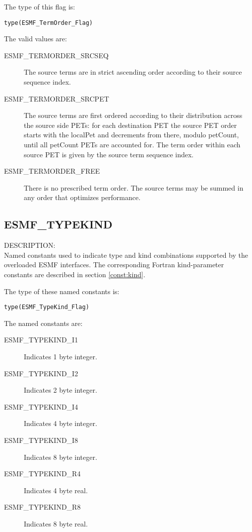 The type of this flag is:

{\tt type(ESMF\_TermOrder\_Flag)}

The valid values are:
\begin{description}

\item [ESMF\_TERMORDER\_SRCSEQ]
         The source terms are in strict ascending order according to
         their source sequence index.
\item [ESMF\_TERMORDER\_SRCPET]
         The source terms are first ordered according to their distribution
         across the source side PETs: for each destination PET the source PET
         order starts with the localPet and decrements from there, modulo
         petCount, until all petCount PETs are accounted for. The term order
         within each source PET is given by the source term sequence index.
\item [ESMF\_TERMORDER\_FREE]
         There is no prescribed term order. The source terms may be summed in 
         any order that optimizes performance.
\end{description}


\subsection{ESMF\_TYPEKIND}
\label{const:typekind}

{\sf DESCRIPTION:\\}
Named constants used to indicate type and kind combinations supported by the
overloaded ESMF interfaces. The corresponding Fortran kind-parameter constants
are described in section \ref{const:kind}.

The type of these named constants is:

{\tt type(ESMF\_TypeKind\_Flag)}

The named constants are:
\begin{description}
\item [ESMF\_TYPEKIND\_I1]
      Indicates 1 byte integer.
\item [ESMF\_TYPEKIND\_I2]
      Indicates 2 byte integer.
\item [ESMF\_TYPEKIND\_I4]
      Indicates 4 byte integer.
\item [ESMF\_TYPEKIND\_I8]
      Indicates 8 byte integer.
\item [ESMF\_TYPEKIND\_R4]
      Indicates 4 byte real.
\item [ESMF\_TYPEKIND\_R8]
      Indicates 8 byte real.
\end{description}

